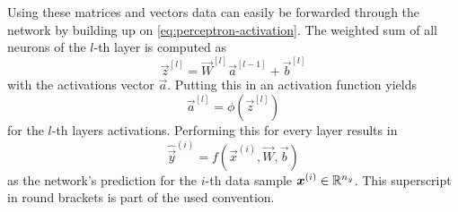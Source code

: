 Using these matrices and vectors data can easily be forwarded through the network by building up on \eqref{eq:perceptron-activation}.
The weighted sum of all neurons of the $l$-th layer is computed as
\begin{equation}
	\label{eq:weighted-sum}
	\vec{z}^{[l]} = \vec{W}^{[l]} \vec{a}^{[l-1]} + \vec{b}^{[l]}
\end{equation}
with the activations vector $\vec{a}$.
Putting this in an activation function yields
\begin{equation}
	\label{eq:activations}
	\vec{a}^{[l]} = \phi\left(\vec{z}^{[l]}\right)
\end{equation}
for the $l$-th layers activations.
Performing this for every layer results in 
\begin{equation}
	\label{eq:feedforward}
	\hat{\vec{y}}^{(i)} = f(\vec{x}^{(i)}, \vec{W}, \vec{b})
\end{equation}
as the network's prediction for the $i$-th data sample $\vec{x^}{(i)} \in \mathbb{R}^{n_y}$.
This superscript in round brackets is part of the used convention.

